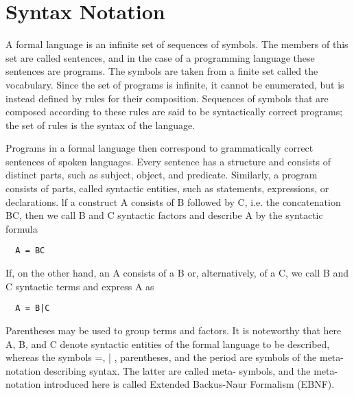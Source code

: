 \chapter{Syntax Notation}
A formal language is an infinite set of sequences of symbols. The members of this set are called
sentences, and in the case of a programming language these sentences are programs. The
symbols are taken from a finite set called the vocabulary. Since the set of programs is infinite, it
cannot be enumerated, but is instead defined by rules for their composition. Sequences of symbols
that are composed according to these rules are said to be syntactically correct programs; the set of
rules is the syntax of the language.

Programs in a formal language then correspond to grammatically correct sentences of spoken
languages. Every sentence has a structure and consists of distinct parts, such as subject, object,
and predicate. Similarly, a program consists of parts, called syntactic entities, such as statements,
expressions, or declarations. lf a construct A consists of B followed by C, i.e. the concatenation BC,
then we call B and C syntactic factors and describe A by the syntactic formula
\begin{verbatim}
  A = BC
\end{verbatim}
If, on the other hand, an A consists of a B or, alternatively, of a C, we call B and C syntactic terms
and express A as
\begin{verbatim}
  A = B|C
\end{verbatim}
Parentheses may be used to group terms and factors. It is noteworthy that here A, B, and C denote
syntactic entities of the formal language to be described, whereas the symbols =, | , parentheses,
and the period are symbols of the meta-notation describing syntax. The latter are called meta-
symbols, and the meta-notation introduced here is called Extended Backus-Naur Formalism (EBNF).

